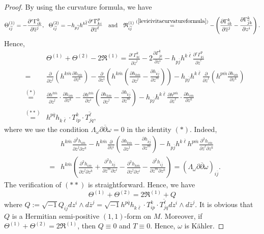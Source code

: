 \documentclass[12pt]{amsart}
\newcommand\bp{{\bar\partial}}
\theoremstyle{plain}
\theoremstyle{definition}
\newcommand{\bproof}{\begin{proof}}
\newcommand{\eproof}{\end{proof}}
\newcommand{\sq}{\sqrt{-1}}
\newcommand{\p}{\partial}
\renewcommand{\bar}{\overline}
\newcommand{\beq}{\begin{equation}}
\newcommand{\eeq}{\end{equation}}
\newcommand{\ee}{\end{eqnarray*}}
\newcommand{\be}{\begin{eqnarray*}}
\newcommand{\qtq}[1]{\quad\mbox{#1}\quad}
\renewcommand{\bp}{\bar{\partial}}
\renewcommand{\>}{\rightarrow}
\newcommand{\ssR}{{\mathfrak R}}
\numberwithin{equation}{section} %
\begin{document}
		\bproof By using the curvature formula, we have 
		$$\Theta^{(1)}_{i\bar j}=-\frac{\p {^c\Gamma_{ik}^k}}{\p \bar z^j},\ \ \Theta^{(2)}_{i\bar j}=-h_{p\bar j}h^{k\bar \ell}\frac{\p{^c\Gamma_{ki}^p}}{\p\bar z^\ell} \qtq{and} \ssR^{(1)}_{i\bar j}\stackrel{(\ref{levicivitacurvatureformula})}{=}-\left(\frac{\p\Gamma_{ik}^k}{\p\bar z^j}-\frac{\p\Gamma_{\bar j k}^k	}{\p z^i}\right).$$
		Hence, 
		\be &&\Theta^{(1)}+\Theta^{(2)}-2\ssR^{(1)}=\frac{\p {^c\Gamma}_{ki}^k}{\p \bar z^j}-2\frac{\p\Gamma_{\bar j k}^k	}{\p z^i} -h_{p\bar j}h^{k\bar \ell}\frac{\p{^c\Gamma_{ki}^p}}{\p\bar z^\ell}\\
		&=&\frac{\p }{\p \bar z^j}\left(h^{k\bar m}\frac{\p h_{i\bar m}}{\p z^k}\right)-\frac{\p}{\p  z^i}\left(h^{k\bar m}\left(\frac{\p h_{k\bar m}}{\p \bar z^j}-\frac{\p h_{k\bar j}}{\p \bar z^m}\right) \right) -h_{p\bar j}h^{k\bar \ell}\frac{\p}{\p\bar z^\ell}\left(h^{p\bar m}\frac{\p h_{i\bar m}}{\p z^k}\right)\\&\stackrel{(*)}{=}&\frac{\p h^{k\bar m} }{\p \bar z^j}\cdot \frac{\p h_{i\bar m}}{\p z^k}-\frac{\p h^{k\bar m}}{\p  z^i}\left(\frac{\p h_{k\bar m}}{\p \bar z^j}-\frac{\p h_{k\bar j}}{\p \bar z^m}\right) -h_{p\bar j}h^{k\bar \ell}\frac{\p h^{p\bar m}}{\p\bar z^\ell}\cdot \frac{\p h_{i\bar m}}{\p z^k}\\
		&\stackrel{(**)}{=}& h^{p\bar q}
		h_{k \bar \ell}\cdot T_{ip}^k\cdot \bar {T_{jq}^\ell},\ee	
		where we use the condition $\Lambda_\omega \p\bp \omega=0$ in the identity $(*)$. Indeed,
		\be &&h^{k\bar m}\frac{\p^2 h_{i\bar m}}{\p\bar z^j\p z^k}- h^{k\bar m}\frac{\p}{\p  z^i}\left(\frac{\p h_{k\bar m}}{\p \bar z^j}-\frac{\p h_{k\bar j}}{\p \bar z^m}\right) -h_{p\bar j}h^{k\bar \ell} h^{p\bar m} \frac{\p^2 h_{i\bar m}}{\p\bar z^\ell\p z^k}\\
		&=&h^{k\bar m}\left(\frac{\p^2 h_{i\bar m}}{\p\bar z^j\p z^k}+\frac{\p^2 h_{k\bar j}}{\p\bar z^m\p z^i}-\frac{\p^2 h_{k\bar m}}{\p\bar z^j\p z^i}-\frac{\p^2 h_{i\bar j}}{\p\bar z^m\p z^k}\right)=(\Lambda_\omega\p\bp\omega)_{i\bar j}.\ee
		The verification of $(**)$ is straightforward.  Hence, we have 
		\beq \Theta^{(1)}+\Theta^{(2)}=2\ssR^{(1)}+Q\eeq
		where $Q:= \sq Q_{i\bar j}dz^i\wedge d\bar z^j=\sq h^{p\bar q}
		h_{k \bar \ell}\cdot T_{ip}^k\cdot \bar {T_{jq}^\ell} dz^i\wedge d\bar
		z^j.$  It is obvious that $Q$ is a Hermitian semi-positive $(1,1)$-form on $M$. Moreover, if  $ \Theta^{(1)}+\Theta^{(2)}=2\ssR^{(1)}$, then $Q\equiv 0$ and $T\equiv 0$. Hence, $\omega$ is K\"ahler.
		\eproof
		
		
		
\end{document}
